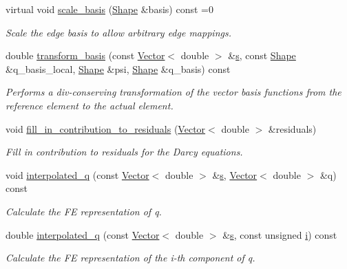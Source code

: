 \begin{DoxyCompactItemize}
virtual void \hyperlink{classoomph_1_1DarcyEquations_a2d2b51170939e5804d18d59e2f6b4222}{scale\+\_\+basis} (\hyperlink{classoomph_1_1Shape}{Shape} \&basis) const =0
\begin{DoxyCompactList}\small\item\em Scale the edge basis to allow arbitrary edge mappings. \end{DoxyCompactList}\item 
double \hyperlink{classoomph_1_1DarcyEquations_a7baf04e00b11ce49b04ff78022b5e382}{transform\+\_\+basis} (const \hyperlink{classoomph_1_1Vector}{Vector}$<$ double $>$ \&\hyperlink{cfortran_8h_ab7123126e4885ef647dd9c6e3807a21c}{s}, const \hyperlink{classoomph_1_1Shape}{Shape} \&q\+\_\+basis\+\_\+local, \hyperlink{classoomph_1_1Shape}{Shape} \&psi, \hyperlink{classoomph_1_1Shape}{Shape} \&q\+\_\+basis) const
\begin{DoxyCompactList}\small\item\em Performs a div-\/conserving transformation of the vector basis functions from the reference element to the actual element. \end{DoxyCompactList}\item 
void \hyperlink{classoomph_1_1DarcyEquations_a80171b8774d687ec6337f5be1a7f5fdd}{fill\+\_\+in\+\_\+contribution\+\_\+to\+\_\+residuals} (\hyperlink{classoomph_1_1Vector}{Vector}$<$ double $>$ \&residuals)
\begin{DoxyCompactList}\small\item\em Fill in contribution to residuals for the Darcy equations. \end{DoxyCompactList}\item 
void \hyperlink{classoomph_1_1DarcyEquations_a60153f3aba6a1b68b09ea175f41b9edf}{interpolated\+\_\+q} (const \hyperlink{classoomph_1_1Vector}{Vector}$<$ double $>$ \&\hyperlink{cfortran_8h_ab7123126e4885ef647dd9c6e3807a21c}{s}, \hyperlink{classoomph_1_1Vector}{Vector}$<$ double $>$ \&q) const
\begin{DoxyCompactList}\small\item\em Calculate the FE representation of q. \end{DoxyCompactList}\item 
double \hyperlink{classoomph_1_1DarcyEquations_a38e9886909c756f121dd3d0ae6036328}{interpolated\+\_\+q} (const \hyperlink{classoomph_1_1Vector}{Vector}$<$ double $>$ \&\hyperlink{cfortran_8h_ab7123126e4885ef647dd9c6e3807a21c}{s}, const unsigned \hyperlink{cfortran_8h_adb50e893b86b3e55e751a42eab3cba82}{i}) const
\begin{DoxyCompactList}\small\item\em Calculate the FE representation of the i-\/th component of q. \end{DoxyCompactList}\item 

\end{DoxyCompactItemize}
